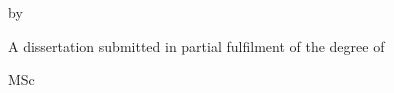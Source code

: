\begin{titlepage}
	
\begin{centering}
\begin{Large}
	
	\thesisUniversity
	
	\thesisFaculty
	
	\thesisSchool
	
	\vspace{3em}
	
	\thesisTitle
	
	by
	
	\thesisAuthor
	
	\thesisDate
	
	\vfill
	
	A dissertation submitted in partial fulfilment of the degree of
	
	MSc \MScPathway
	
	\vfill
	
\end{Large}
\end{centering}

\end{titlepage}